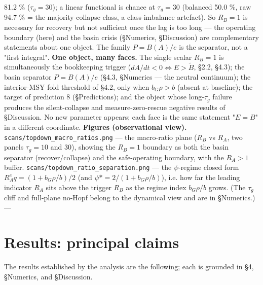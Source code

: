 \documentclass[11pt]{article}
\begin{document}
81.2 \% ($\tau{}_{g} = 30$); a linear functional is chance at $\tau{}_{g} = 30$ (balanced 50.0 \%, raw 94.7 \% = the majority-collapse class, a class-imbalance artefact). So $R_{B} = 1$ is necessary for recovery but not sufficient once the lag is too long — the operating boundary (here) and the basin crisis (§Numerics, §Discussion) are complementary statements about one object. The family $P = B(A)/e$ is the separator, not a "first integral". \textbf{One object, many faces.} The single scalar $R_{B} = 1$ is simultaneously the bookkeeping trigger ($dA/dt < 0 \iff{} E > \tilde{B}$, §2.2, §4.3); the basin separator $P = B(A)/e$ (§4.3, §Numerics — the neutral continuum); the interior-MSY fold threshold of §4.2, only when $b_{G}\rho{} > b$ (absent at baseline); the target of prediction 8 (§Predictions); and the object whose long-$\tau{}_{g}$ failure produces the silent-collapse and measure-zero-rescue negative results of §Discussion. No new parameter appears; each face is the same statement "$E = B$" in a different coordinate. \textbf{Figures (observational view).} \texttt{scans/topdown\_macro\_ratios.png} — the macro-ratio plane ($R_{B}$ vs $R_{A}$, two panels $\tau{}_{g}=10$ and 30), showing the $R_{B}=1$ boundary as both the basin separator (recover/collapse) and the safe-operating boundary, with the $R_{A}>1$ buffer. \texttt{scans/topdown\_ratio\_separation.png} — the \ensuremath{\psi{}}-regime closed form $R_{A}^eq=(1+b_{G}\rho{}/b)/2$ (and $\psi{}*=2/(1+b_{G}\rho{}/b)$), i.e. how far the leading indicator $R_{A}$ sits above the trigger $R_{B}$ as the regime index $b_{G}\rho{}/b$ grows. (The $\tau{}_{g}$ cliff and full-plane no-Hopf belong to the dynamical view and are in §Numerics.) ---

\section{Results: principal claims}

The results established by the analysis are the following; each is grounded in §4, §Numerics, and §Discussion.
\end{document}
